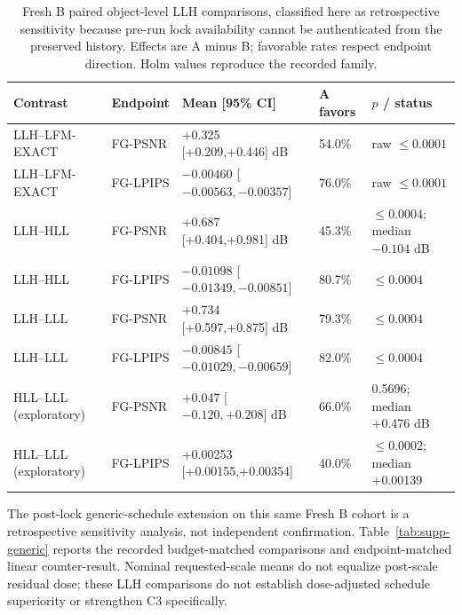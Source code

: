 \documentclass[11pt]{article}
\begin{document}
\begin{table}[ht]
\centering\small
\caption{Fresh B paired object-level LLH comparisons, classified here as retrospective sensitivity because pre-run lock availability cannot be authenticated from the preserved history. Effects are A minus B; favorable rates respect endpoint direction. Holm values reproduce the recorded family.}\label{tab:supp-freshb}
\begin{tabular}{p{3.7cm}p{1.7cm}p{5.7cm}p{1.4cm}p{2.2cm}}\toprule Contrast & Endpoint & Mean [95\% CI] & A favors & $p$ / status \\\midrule
LLH--LFM-EXACT & FG-PSNR & +0.325 [+0.209,+0.446] dB & 54.0\% & raw $\leq0.0001$ \\
LLH--LFM-EXACT & FG-LPIPS & $-0.00460$ [$-0.00563,-0.00357$] & 76.0\% & raw $\leq0.0001$ \\
LLH--HLL & FG-PSNR & +0.687 [+0.404,+0.981] dB & 45.3\% & $\leq0.0004$; median $-0.104$ dB \\
LLH--HLL & FG-LPIPS & $-0.01098$ [$-0.01349,-0.00851$] & 80.7\% & $\leq0.0004$ \\
LLH--LLL & FG-PSNR & +0.734 [+0.597,+0.875] dB & 79.3\% & $\leq0.0004$ \\
LLH--LLL & FG-LPIPS & $-0.00845$ [$-0.01029,-0.00659$] & 82.0\% & $\leq0.0004$ \\
HLL--LLL (exploratory) & FG-PSNR & +0.047 [$-0.120,+0.208$] dB & 66.0\% & 0.5696; median +0.476 dB \\
HLL--LLL (exploratory) & FG-LPIPS & +0.00253 [+0.00155,+0.00354] & 40.0\% & $\leq0.0002$; median +0.00139 \\
\bottomrule\end{tabular}
\end{table}

The post-lock generic-schedule extension on this same Fresh B cohort is a retrospective sensitivity analysis, not independent confirmation. Table~\ref{tab:supp-generic} reports the recorded budget-matched comparisons and endpoint-matched linear counter-result. Nominal requested-scale means do not equalize post-scale residual dose; these LLH comparisons do not establish dose-adjusted schedule superiority or strengthen C3 specifically.
\end{document}
